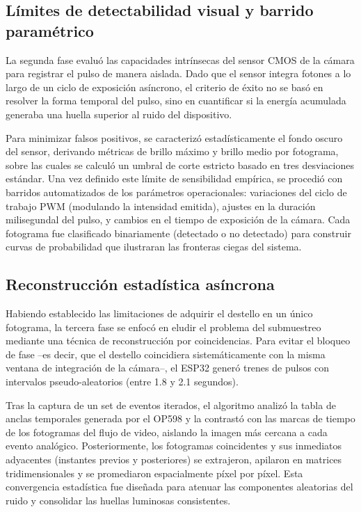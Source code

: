\documentclass[10pt,a4paper,twocolumn]{article}
\begin{document}
\subsection{Límites de detectabilidad visual y barrido paramétrico}
La segunda fase evaluó las capacidades intrínsecas del sensor CMOS de la cámara para registrar el pulso de manera aislada. Dado que el sensor integra fotones a lo largo de un ciclo de exposición asíncrono, el criterio de éxito no se basó en resolver la forma temporal del pulso, sino en cuantificar si la energía acumulada generaba una huella superior al ruido del dispositivo.

Para minimizar falsos positivos, se caracterizó estadísticamente el fondo oscuro del sensor, derivando métricas de brillo máximo y brillo medio por fotograma, sobre las cuales se calculó un umbral de corte estricto basado en tres desviaciones estándar. Una vez definido este límite de sensibilidad empírica, se procedió con barridos automatizados de los parámetros operacionales: variaciones del ciclo de trabajo PWM (modulando la intensidad emitida), ajustes en la duración milisegundal del pulso, y cambios en el tiempo de exposición de la cámara. Cada fotograma fue clasificado binariamente (detectado o no detectado) para construir curvas de probabilidad que ilustraran las fronteras ciegas del sistema.

\subsection{Reconstrucción estadística asíncrona}
Habiendo establecido las limitaciones de adquirir el destello en un único fotograma, la tercera fase se enfocó en eludir el problema del submuestreo mediante una técnica de reconstrucción por coincidencias. Para evitar el bloqueo de fase --es decir, que el destello coincidiera sistemáticamente con la misma ventana de integración de la cámara--, el ESP32 generó trenes de pulsos con intervalos pseudo-aleatorios (entre 1.8 y 2.1 segundos).

Tras la captura de un set de eventos iterados, el algoritmo analizó la tabla de anclas temporales generada por el OP598 y la contrastó con las marcas de tiempo de los fotogramas del flujo de video, aislando la imagen más cercana a cada evento analógico. Posteriormente, los fotogramas coincidentes y sus inmediatos adyacentes (instantes previos y posteriores) se extrajeron, apilaron en matrices tridimensionales y se promediaron espacialmente píxel por píxel. Esta convergencia estadística fue diseñada para atenuar las componentes aleatorias del ruido y consolidar las huellas luminosas consistentes.
\end{document}
